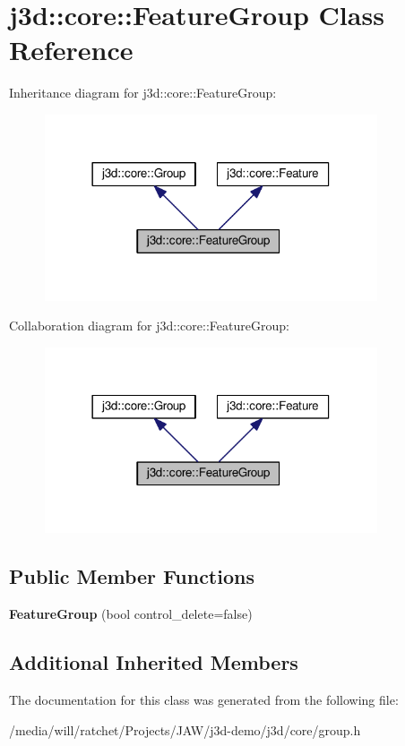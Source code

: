 \hypertarget{classj3d_1_1core_1_1FeatureGroup}{}\section{j3d\+:\+:core\+:\+:Feature\+Group Class Reference}
\label{classj3d_1_1core_1_1FeatureGroup}


Inheritance diagram for j3d\+:\+:core\+:\+:Feature\+Group\+:
\nopagebreak
\begin{figure}[H]
\begin{center}
\leavevmode
\includegraphics[width=278pt]{classj3d_1_1core_1_1FeatureGroup__inherit__graph}
\end{center}
\end{figure}


Collaboration diagram for j3d\+:\+:core\+:\+:Feature\+Group\+:
\nopagebreak
\begin{figure}[H]
\begin{center}
\leavevmode
\includegraphics[width=278pt]{classj3d_1_1core_1_1FeatureGroup__coll__graph}
\end{center}
\end{figure}
\subsection*{Public Member Functions}
\begin{DoxyCompactItemize}
\item 
\hypertarget{classj3d_1_1core_1_1FeatureGroup_a7dd8a4f38351ec73140d1879bb43e1cf}{}{\bfseries Feature\+Group} (bool control\+\_\+delete=false)\label{classj3d_1_1core_1_1FeatureGroup_a7dd8a4f38351ec73140d1879bb43e1cf}

\end{DoxyCompactItemize}
\subsection*{Additional Inherited Members}


The documentation for this class was generated from the following file\+:\begin{DoxyCompactItemize}
\item 
/media/will/ratchet/\+Projects/\+J\+A\+W/j3d-\/demo/j3d/core/group.\+h\end{DoxyCompactItemize}
